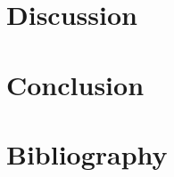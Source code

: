 \documentclass[%
preprint, linenumbers,
groupedaddress,
amsmath,amssymb,
aps, physrev,
]{revtex4-2}
\begin{document}
\section{Discussion}




\section{Conclusion}

\clearpage



\nocite{*}

\section{Bibliography}

\clearpage

\appendix


\end{document}
